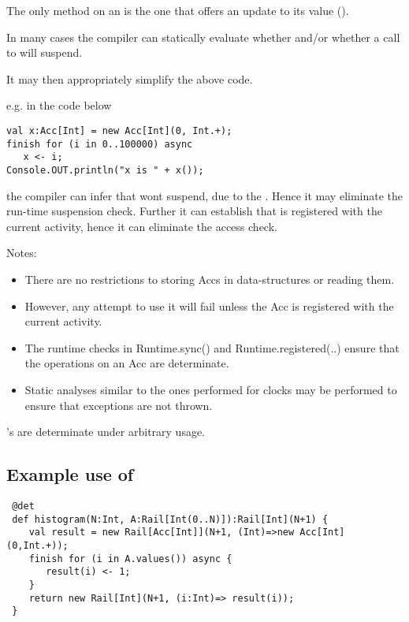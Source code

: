 The only  method on an  is the one that offers an
update to its value ().

In many cases the compiler can statically evaluate whether
 and/or whether a call to 
  will suspend. 

It may then appropriately simplify the above code.

e.g. in the code below
\begin{lstlisting}
val x:Acc[Int] = new Acc[Int](0, Int.+);
finish for (i in 0..100000) async
   x <- i;
Console.OUT.println("x is " + x());  
\end{lstlisting}
\noindent the compiler can infer that  wont suspend, due to
the . Hence it may eliminate the run-time suspension
check. Further it can establish that  is 
registered with the current activity, hence it can eliminate the
access check. 

Notes:
\begin{itemize}
\item 
   There are no restrictions to storing Accs in
   data-structures or reading them. 

\item   However, any attempt to use it will fail unless the Acc is
   registered with the current activity.

\item   The runtime checks in Runtime.sync() and Runtime.registered(..)
   ensure that the operations on an Acc are determinate.

\item
   Static analyses similar to the ones performed for clocks may be
   performed to ensure that exceptions are not thrown.
\end{itemize}

\begin{proposition}
's are determinate under arbitrary usage.   
\end{proposition}

\subsection{Example use of }
\begin{example}[Histogram]
\begin{lstlisting}
 @det
 def histogram(N:Int, A:Rail[Int(0..N)]):Rail[Int](N+1) {
    val result = new Rail[Acc[Int]](N+1, (Int)=>new Acc[Int](0,Int.+));
    finish for (i in A.values()) async {
       result(i) <- 1;
    }
    return new Rail[Int](N+1, (i:Int)=> result(i));
 }
\end{lstlisting}
\end{example}

